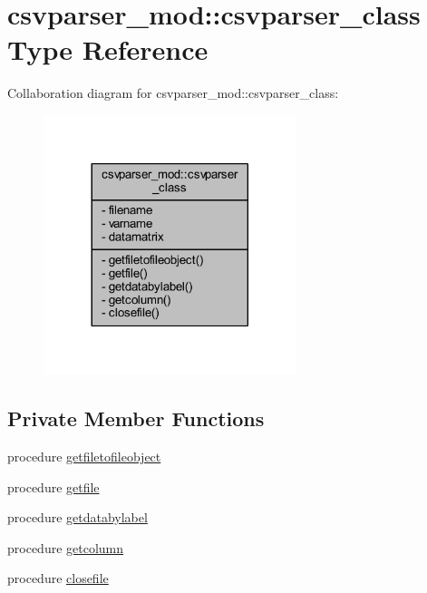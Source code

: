 \hypertarget{structcsvparser__mod_1_1csvparser__class}{}\section{csvparser\+\_\+mod\+:\+:csvparser\+\_\+class Type Reference}
\label{structcsvparser__mod_1_1csvparser__class}


Collaboration diagram for csvparser\+\_\+mod\+:\+:csvparser\+\_\+class\+:\nopagebreak
\begin{figure}[H]
\begin{center}
\leavevmode
\includegraphics[width=209pt]{structcsvparser__mod_1_1csvparser__class__coll__graph}
\end{center}
\end{figure}
\subsection*{Private Member Functions}
\begin{DoxyCompactItemize}
\item 
procedure \mbox{\hyperlink{structcsvparser__mod_1_1csvparser__class_a9b0867325f70b9683aa558da0e5c6ddd}{getfiletofileobject}}
\item 
procedure \mbox{\hyperlink{structcsvparser__mod_1_1csvparser__class_ac81d9b3ae0e228bc9e0005b0f59246dd}{getfile}}
\item 
procedure \mbox{\hyperlink{structcsvparser__mod_1_1csvparser__class_a78bad130ba3380571a2a19ae419c5668}{getdatabylabel}}
\item 
procedure \mbox{\hyperlink{structcsvparser__mod_1_1csvparser__class_a5181391410574d31ea7ed93091f2d21a}{getcolumn}}
\item 
procedure \mbox{\hyperlink{structcsvparser__mod_1_1csvparser__class_a1daa0b05831e325af862044831d5aade}{closefile}}
\end{DoxyCompactItemize}

